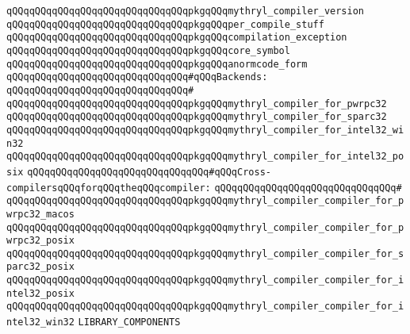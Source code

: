 \verb|qQQqqQQqqQQqqQQqqQQqqQQqqQQqqQQqpkgqQQqmythryl_compiler_version|\newline
\verb|qQQqqQQqqQQqqQQqqQQqqQQqqQQqqQQqpkgqQQqper_compile_stuff|\newline
\verb|qQQqqQQqqQQqqQQqqQQqqQQqqQQqqQQqpkgqQQqcompilation_exception|\newline
\verb|qQQqqQQqqQQqqQQqqQQqqQQqqQQqqQQqpkgqQQqcore_symbol|\newline
\verb|qQQqqQQqqQQqqQQqqQQqqQQqqQQqqQQqpkgqQQqanormcode_form|\newline
\newline
\verb|qQQqqQQqqQQqqQQqqQQqqQQqqQQqqQQq#qQQqBackends:|\newline
\verb|qQQqqQQqqQQqqQQqqQQqqQQqqQQqqQQq#|\newline
\verb|qQQqqQQqqQQqqQQqqQQqqQQqqQQqqQQqpkgqQQqmythryl_compiler_for_pwrpc32|\newline
\verb|qQQqqQQqqQQqqQQqqQQqqQQqqQQqqQQqpkgqQQqmythryl_compiler_for_sparc32|\newline
\verb|qQQqqQQqqQQqqQQqqQQqqQQqqQQqqQQqpkgqQQqmythryl_compiler_for_intel32_win32|\newline
\verb|qQQqqQQqqQQqqQQqqQQqqQQqqQQqqQQqpkgqQQqmythryl_compiler_for_intel32_posix|\newline
\newline
\newline
\verb|qQQqqQQqqQQqqQQqqQQqqQQqqQQqqQQq#qQQqCross-compilersqQQqforqQQqtheqQQqcompiler:|\newline
\verb|qQQqqQQqqQQqqQQqqQQqqQQqqQQqqQQq#|\newline
\verb|qQQqqQQqqQQqqQQqqQQqqQQqqQQqqQQqpkgqQQqmythryl_compiler_compiler_for_pwrpc32_macos|\newline
\verb|qQQqqQQqqQQqqQQqqQQqqQQqqQQqqQQqpkgqQQqmythryl_compiler_compiler_for_pwrpc32_posix|\newline
\verb|qQQqqQQqqQQqqQQqqQQqqQQqqQQqqQQqpkgqQQqmythryl_compiler_compiler_for_sparc32_posix|\newline
\verb|qQQqqQQqqQQqqQQqqQQqqQQqqQQqqQQqpkgqQQqmythryl_compiler_compiler_for_intel32_posix|\newline
\verb|qQQqqQQqqQQqqQQqqQQqqQQqqQQqqQQqpkgqQQqmythryl_compiler_compiler_for_intel32_win32|\newline
\newline
\newline
\newline
\newline
\verb|LIBRARY_COMPONENTS|\newline
\newline
